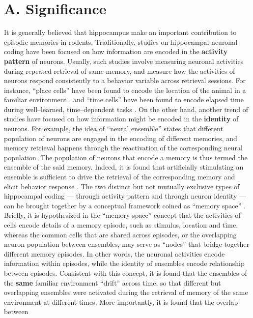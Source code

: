 \documentclass[master.tex]{subfiles}
\begin{document}
\section*{A. Significance}

It is generally believed that hippocampus make an important contribution to
episodic memories in rodents. Traditionally, studies on hippocampal neuronal
coding have been focused on how information are encoded in the \textbf{activity
  pattern} of neurons. Usually, such studies involve measuring neuronal
activities during repeated retrieval of same memory, and measure how the
activities of neurons respond consistently to a behavior variable across
retrieval sessions. For instance, ``place cells'' have been found to encode the
location of the animal in a familiar environment \cite{hartley_space_2014}, and
``time cells'' have been found to encode elapsed time during well--learned,
time--dependent tasks \cite{eichenbaum_time_2014}. On the other hand, another
trend of studies have focused on how information might be encoded in the
\textbf{identity} of neurons. For example, the idea of ``neural ensemble''
states that different population of neurons are engaged in the encoding of
different memories, and memory retrieval happens through the reactivation of the
corresponding neural population. The population of neurons that encode a memory
is thus termed the ensemble of the said memory. Indeed, it is found that
artificially stimulating an ensemble is sufficient to drive the retrieval of the
corresponding memory and elicit behavior response \cite{ramirez_creating_2013}.
The two distinct but not mutually exclusive types of hippocampal coding ---
through activity pattern and through neuron identity --- can be brought together
by a conceptual framework coined as ``memory space''
\cite{eichenbaum_hippocampus_1999}. Briefly, it is hypothesized in the ``memory
space'' concept that the activities of cells encode details of a memory episode,
such as stimulus, location and time, whereas the common cells that are shared
across episodes, or the overlapping neuron population between ensembles, may
serve as ``nodes'' that bridge together different memory episodes. In other
words, the neuronal activities encode information within episodes, while the
identity of ensembles encode relationship between episodes. Consistent with this
concept, it is found that the ensembles of the \textbf{same} familiar
environment ``drift'' across time, so that different but overlapping ensembles
were activated during the retrieval of memory of the same environment at
different times. More importantly, it is found that the overlap between
\end{document}
